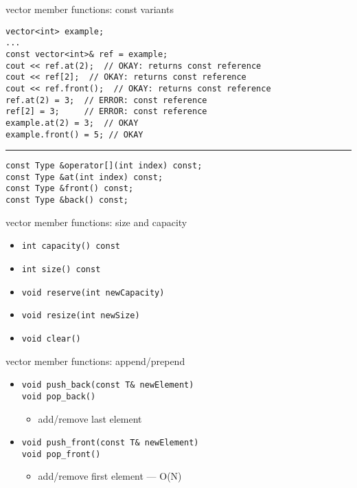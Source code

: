     \begin{frame}[fragile,label=vectMethConst]{vector member functions: const variants}
\lstset{
    language=C++,
    style=small
}
\begin{lstlisting}
vector<int> example;
...
const vector<int>& ref = example;
cout << ref.at(2);  // OKAY: returns const reference
cout << ref[2];  // OKAY: returns const reference
cout << ref.front();  // OKAY: returns const reference
ref.at(2) = 3;  // ERROR: const reference
ref[2] = 3;     // ERROR: const reference
example.at(2) = 3;  // OKAY
example.front() = 5; // OKAY
\end{lstlisting}
\hrule
\begin{lstlisting}
const Type &operator[](int index) const;
const Type &at(int index) const;
const Type &front() const;
const Type &back() const;
\end{lstlisting}
\end{frame}

    \begin{frame}[fragile,label=vectMethSize]{vector member functions: size and capacity}
\lstset{
    language=C++,
    style=small
}
\begin{itemize}
\item \lstinline|int capacity() const|
\item \lstinline|int size() const|
\item \lstinline|void reserve(int newCapacity)|
\item \lstinline|void resize(int newSize)|
\item \lstinline|void clear()|
\end{itemize}
\end{frame}


\begin{frame}[fragile,label=vectMethApp]{vector member functions: append/prepend}
\lstset{
    language=C++,
    style=small
}
\begin{itemize}
\item \lstinline|void push_back(const T& newElement)| \\
      \lstinline|void pop_back()|
\begin{itemize}\item add/remove last element\end{itemize}
\item \lstinline|void push_front(const T& newElement)| \\
      \lstinline|void pop_front()|
\begin{itemize}\item add/remove first element --- O(N)\end{itemize}
\end{itemize}
\end{frame}

